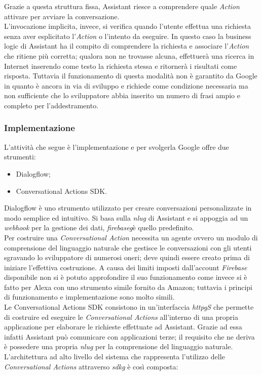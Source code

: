 		Grazie a questa struttura fissa, Assistant riesce a comprendere quale \emph{Action} attivare per avviare la conversazione. \\
		L'invocazione implicita, invece, si verifica quando l'utente effettua una richiesta senza aver esplicitato l'\emph{Action} o l'intento da eseguire. In questo caso la business logic di Assistant ha il compito di comprendere la richiesta e associare l'\emph{Action} che ritiene più corretta; qualora non ne trovasse alcuna, effettuerà una ricerca in Internet inserendo come testo la richiesta stessa e ritornerà i risultati come risposta. Tuttavia il funzionamento di questa modalità non è garantito da Google in quanto è ancora in via di sviluppo e richiede come condizione necessaria ma non sufficiente che lo sviluppatore abbia inserito un numero di frasi ampio e completo per l'addestramento.
		\subsubsection{Implementazione}
		L'attività che segue è l'implementazione e per svolgerla Google offre due strumenti:
		\begin{itemize}
			\item Dialogflow;
			\item Conversational Actions SDK.
		\end{itemize}
		Dialogflow è uno strumento utilizzato per creare conversazioni personalizzate in modo semplice ed intuitivo. Si basa sulla \emph{\gls{nlug}} di Assistant e si appoggia ad un \emph{webhook} per la gestione dei dati, \emph{\gls{firebaseg}}\glsfirstoccur è quello predefinito. \\
		Per costruire una \emph{Conversational Action} necessita un agente ovvero un modulo di comprensione del linguaggio naturale che gestisce le conversazioni con gli utenti sgravando lo sviluppatore di numerosi oneri; deve quindi essere creato prima di iniziare l'effettiva costruzione. A causa dei limiti imposti dall'account \emph{Firebase} disponibile non si è potuto approfondire il suo funzionamento come invece si è fatto per Alexa con uno strumento simile fornito da Amazon; tuttavia i principi di funzionamento e implementazione sono molto simili. \\
		Le Conversational Actions SDK consistono in un'interfaccia \emph{\gls{httpg}S} che permette di costruire ed eseguire le \emph{Conversational Actions} all'interno di una propria applicazione per elaborare le richieste effettuate ad Assistant. Grazie ad essa infatti Assistant può comunicare con applicazioni terze; il requisito che ne deriva è possedere una propria \emph{\gls{nlug}} per la comprensione del linguaggio naturale. L'architettura ad alto livello del sistema che rappresenta l'utilizzo delle \emph{Conversational Actions} attraverso \emph{\gls{sdkg}} è così composta:

